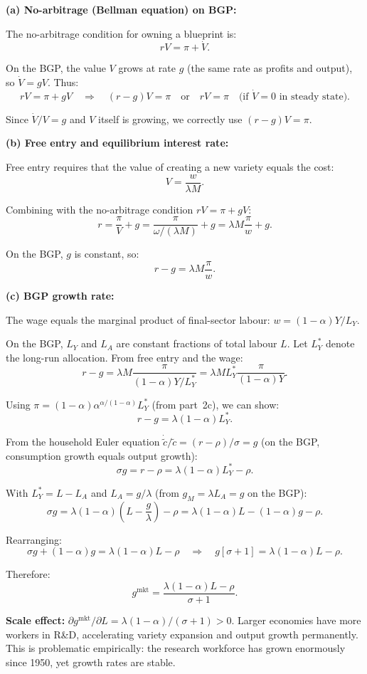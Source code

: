 \documentclass[a4paper,11pt]{article}
\newcommand{\ctilde}{\tilde{c}}
\begin{document}
\begin{answerbox}
\textbf{(a) No-arbitrage (Bellman equation) on BGP:}

The no-arbitrage condition for owning a blueprint is:
\[
    rV = \pi + \dot{V}.
\]

On the BGP, the value $V$ grows at rate $g$ (the same rate as profits and output), so $\dot{V} = g V$.  Thus:
\[
    rV = \pi + gV
    \quad\Longrightarrow\quad
    \boxed{(r-g)V = \pi \quad\text{or}\quad rV = \pi \quad\text{(if } \dot{V}=0 \text{ in steady state)}.}
\]

Since $\dot{V}/V = g$ and $V$ itself is growing, we correctly use $(r-g)V = \pi$.

\textbf{(b) Free entry and equilibrium interest rate:}

Free entry requires that the value of creating a new variety equals the cost:
\[
    V = \frac{w}{\lambda M}.
\]

Combining with the no-arbitrage condition $rV = \pi + gV$:
\[
    r = \frac{\pi}{V} + g = \frac{\pi}{\omega/(\lambda M)} + g
    = \boxed{\lambda M \frac{\pi}{w} + g.}
\]

On the BGP, $g$ is constant, so:
\[
    r - g = \lambda M \frac{\pi}{w}.
\]

\textbf{(c) BGP growth rate:}

The wage equals the marginal product of final-sector labour: $w = (1-\alpha)Y/L_Y$.

On the BGP, $L_Y$ and $L_A$ are constant fractions of total labour $L$. Let $L_Y^*$ denote the long-run allocation. From free entry and the wage:
\[
    r - g = \lambda M \frac{\pi}{(1-\alpha)Y/L_Y^*}
    = \lambda M L_Y^* \frac{\pi}{(1-\alpha)Y}.
\]

Using $\pi = (1-\alpha)\alpha^{\alpha/(1-\alpha)}L_Y^*$ (from part~2c), we can show:
\[
    r - g = \lambda(1-\alpha)L_Y^*.
\]

From the household Euler equation $\dot{\ctilde}/\ctilde = (r - \rho)/\sigma = g$ (on the BGP, consumption growth equals output growth):
\[
    \sigma g = r - \rho = \lambda(1-\alpha)L_Y^* - \rho.
\]

With $L_Y^* = L - L_A$ and $L_A = g/\lambda$ (from $g_M = \lambda L_A = g$ on the BGP):
\[
    \sigma g = \lambda(1-\alpha)\left(L - \frac{g}{\lambda}\right) - \rho
    = \lambda(1-\alpha)L - (1-\alpha)g - \rho.
\]

Rearranging:
\[
    \sigma g + (1-\alpha)g = \lambda(1-\alpha)L - \rho
    \quad\Longrightarrow\quad
    g[\sigma + 1] = \lambda(1-\alpha)L - \rho.
\]

Therefore:
\[
    \boxed{g^{\mathrm{mkt}} = \frac{\lambda(1-\alpha)L - \rho}{\sigma + 1}.}
\]

\textbf{Scale effect:} $\partial g^{\mathrm{mkt}}/\partial L = \lambda(1-\alpha)/(\sigma+1) > 0$. Larger economies have more workers in R\&D, accelerating variety expansion and output growth permanently. This is problematic empirically: the research workforce has grown enormously since 1950, yet growth rates are stable.
\end{answerbox}
\end{document}
